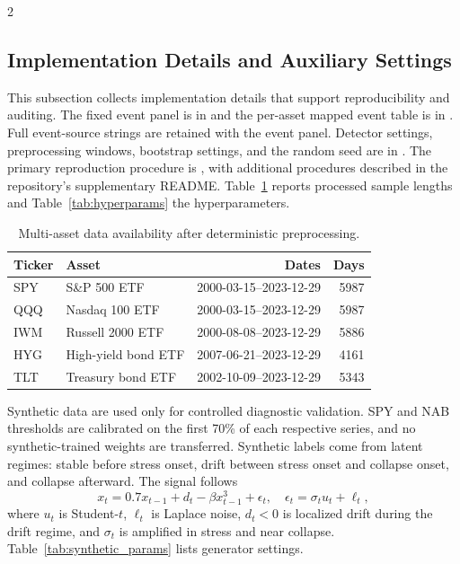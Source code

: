 \documentclass{book}
\begin{document}
\begin{multicols}{2}
\subsection{Implementation Details and Auxiliary Settings}
\label{sec:implementation}
\sloppy This subsection collects implementation details that support reproducibility and auditing. The fixed event panel is in  and the per-asset mapped event table is in . Full event-source strings are retained with the event panel. Detector settings, preprocessing windows, bootstrap settings, and the random seed are in . The primary reproduction procedure is , with additional procedures described in the repository's supplementary README. Table~\ref{tab:asset_availability} reports processed sample lengths and Table~\ref{tab:hyperparams} the hyperparameters.

\begin{table}[H]
\centering
\caption{Multi-asset data availability after deterministic preprocessing.}
\label{tab:asset_availability}
\scriptsize
\begin{tabular}{llrr}
\toprule
Ticker & Asset & Dates & Days\\
\midrule
SPY & S\&P 500 ETF & 2000-03-15--2023-12-29 & 5987\\
QQQ & Nasdaq 100 ETF & 2000-03-15--2023-12-29 & 5987\\
IWM & Russell 2000 ETF & 2000-08-08--2023-12-29 & 5886\\
HYG & High-yield bond ETF & 2007-06-21--2023-12-29 & 4161\\
TLT & Treasury bond ETF & 2002-10-09--2023-12-29 & 5343\\
\bottomrule
\end{tabular}
\end{table}

Synthetic data are used only for controlled diagnostic validation. SPY and NAB thresholds are calibrated on the first 70\% of each respective series, and no synthetic-trained weights are transferred. Synthetic labels come from latent regimes: stable before stress onset, drift between stress onset and collapse onset, and collapse afterward. The signal follows
\begin{equation}
x_t=0.7x_{t-1}+d_t-\beta x_{t-1}^3+\epsilon_t,\quad
\epsilon_t=\sigma_t u_t+\ell_t,
\end{equation}
where $u_t$ is Student-$t$, $\ell_t$ is Laplace noise, $d_t<0$ is localized drift during the drift regime, and $\sigma_t$ is amplified in stress and near collapse. Table~\ref{tab:synthetic_params} lists generator settings.


\end{multicols}
\end{document}
